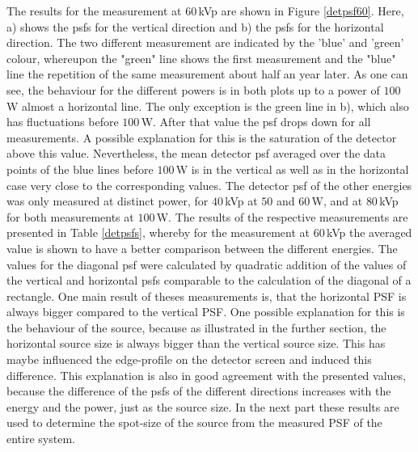 The results for the measurement at $60\,$kVp are shown in Figure \ref{detpsf60}. Here, a) shows the \glspl{psf} for the vertical direction and b) the \glspl{psf} for the horizontal direction. The two different measurement are indicated by the 'blue' and 'green' colour, whereupon the "green" line shows the first measurement and the "blue" line the repetition of the same measurement about half an year later. As one can see, the behaviour for the different powers is in both plots up to a power of $100\,$W almost a horizontal line. The only exception is the green line in b), which also has fluctuations before $100\,$W. After that value the \gls{psf} drops down for all measurements. A possible explanation for this is the saturation of the detector above this value. Nevertheless, the mean detector \gls{psf} averaged over the data points of the blue lines before $100\,$W is in the vertical as well as in the horizontal case very close to the corresponding values. The detector \gls{psf} of the other energies was only measured at distinct power, for $40\,$kVp at $50$ and $60\,$W, and at $80\,$kVp for both measurements at $100\,$W. The results of the respective measurements are presented in Table \ref{detpsfs}, whereby for the measurement at $60\,$kVp the averaged value is shown to have a better comparison between the different energies. The values for the diagonal \gls{psf} were calculated by quadratic addition of the values of the vertical and horizontal \glspl{psf} comparable to the calculation of the diagonal of a rectangle. One main result of theses measurements is, that the horizontal PSF is always bigger compared to the vertical PSF. One possible explanation for this is the behaviour of the source, because as illustrated in the further section, the horizontal source size is always bigger than the vertical source size. This has maybe influenced the edge-profile on the detector screen and induced this difference. This explanation is also in good agreement with the presented values, because the difference of the \glspl{psf} of the different directions increases with the energy and the power, just as the source size. In the next part these results are used to determine the spot-size of the source from the measured PSF of the entire system.    	


